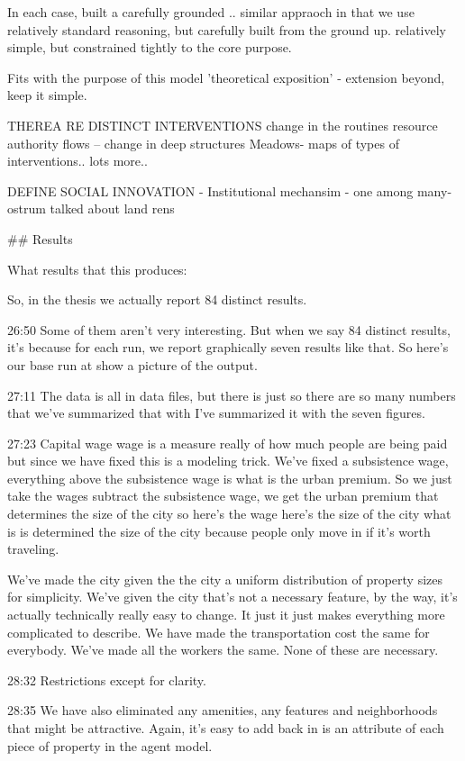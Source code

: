 \documentclass[]{article}
\begin{document}
In each case, built a carefully grounded .. similar appraoch in that we use relatively standard reasoning, but carefully built from the ground up. 
relatively simple, but constrained tightly to the core purpose.

Fits with the purpose of this model 'theoretical exposition' - extension beyond, keep it simple.

THEREA RE DISTINCT INTERVENTIONS
change in the routines resource authority flows -- change in deep structures
Meadows- maps of types of interventions.. lots more.. 

DEFINE SOCIAL INNOVATION - 
Institutional mechansim - one among many- ostrum talked about land rens



## Results


What results that this produces:

So, in the thesis we actually report 84 distinct results.

26:50
Some of them aren't very interesting. But when we say 84 distinct results, it's because for each run, we report graphically seven results like that. So here's our base run at show a picture of the output.

27:11
The data is all in data files, but there is just so there are so many numbers that we've summarized that with I've summarized it with the seven figures.

27:23
Capital wage wage is a measure really of how much people are being paid but since we have fixed this is a modeling trick. We've fixed a subsistence wage, everything above the subsistence wage is what is the urban premium. So we just take the wages subtract the subsistence wage, we get the urban premium that determines the size of the city so here's the wage here's the size of the city what is is determined the size of the city because people only move in if it's worth traveling. 

We've made the city given the the city a uniform distribution of property sizes for simplicity. We've given the city that's not a necessary feature, by the way, it's actually technically really easy to change. It just it just makes everything more complicated to describe. We have made the transportation cost the same for everybody. We've made all the workers the same. None of these are necessary.

28:32
Restrictions except for clarity.

28:35
We have also eliminated any amenities, any features and neighborhoods that might be attractive. Again, it's easy to add back in is an attribute of each piece of property in the agent model.
\end{document}
